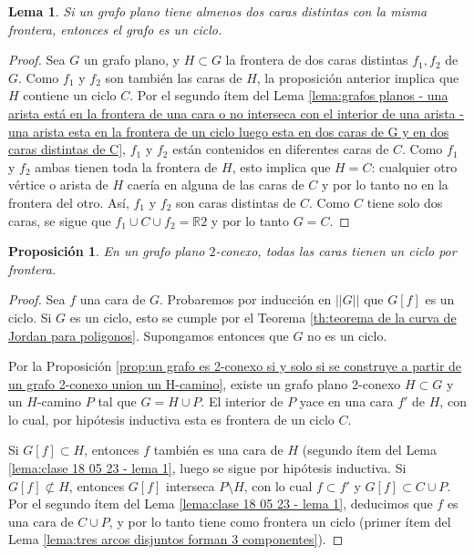 \documentclass[12pt]{report}
\theoremstyle{plain}
\newtheorem{lemma}[theorem]{Lema}
\newtheorem{proposition}[theorem]{Proposición}
\theoremstyle{definition}
\newcommand{\reals}{\mathbb{R}}
\newcommand{\Abs}[1]{\left \vert \left \vert #1 \right \vert \right \vert}
\begin{document}
\begin{lemma}\label{lema:si un grafo plano tiene almenso dos caras con la misma frontera, entonces es un ciclo}
Si un grafo plano tiene almenos dos caras distintas con la misma frontera, entonces el grafo es un ciclo.
\end{lemma}
\begin{proof}
Sea $G$ un grafo plano, y $H \subset G$ la frontera de dos caras distintas $f_1, f_2$ de $G$. Como $f_1$ y $f_2$ son también las caras de $H$, la proposición anterior implica que $H$ contiene un ciclo $C$. Por el segundo ítem del Lema \ref{lema:grafos planos - una arista está en la frontera de una cara o no interseca con el interior de una arista - una arista esta en la frontera de un ciclo luego esta en dos caras de G y en dos caras distintas de C}, $f_1$ y $f_2$ están contenidos en diferentes caras de $C$. Como $f_1$ y $f_2$ ambas tienen toda la frontera de $H$, esto implica que $H = C$: cualquier otro vértice o arista de $H$ caería en alguna de las caras de $C$ y por lo tanto no en la frontera del otro. Así, $f_1$ y $f_2$ son caras distintas de $C$. Como $C$ tiene solo dos caras, se sigue que $f_1 \cup C \cup f_2 = \reals 2$ y por lo tanto $G = C$.
\end{proof}

\begin{proposition}\label{proposicion:un grafo plano 2-conexo tiene todas sus caras con frontera un ciclo}
En un grafo plano $2$-conexo, todas las caras tienen un ciclo por frontera.
\end{proposition}
\begin{proof}
Sea $f$ una cara de $G$. Probaremos por inducción en $\Abs G$ que $G[f]$ es un ciclo. Si $G$ es un ciclo, esto se cumple por el Teorema \ref{th:teorema de la curva de Jordan para poligonos}. Supongamos entonces que $G$ no es un ciclo.

Por la Proposición \ref{prop:un grafo es 2-conexo si y solo si se construye a partir de un grafo 2-conexo union un H-camino}, existe un grafo plano $2$-conexo $H \subset G$ y un $H$-camino $P$ tal que $G = H \cup P$. El interior de $P$ yace en una cara $f'$ de $H$, con lo cual, por hipótesis inductiva esta es frontera de un ciclo $C$.

Si $G[f] \subset H$, entonces $f$ también es una cara de $H$ (segundo ítem del Lema \ref{lema:clase 18 05 23 - lema 1}, luego se sigue por hipótesis inductiva. Si $G[f] \not \subset H$, entonces $G[f]$ interseca $P \setminus H$, con lo cual $f \subset f'$ y $G[f] \subset C \cup P$. Por el segundo ítem del Lema \ref{lema:clase 18 05 23 - lema 1}, deducimos que $f$ es una cara de $C \cup P$, y por lo tanto tiene como frontera un ciclo (primer ítem del Lema \ref{lema:tres arcos disjuntos forman 3 componentes}).
\end{proof}
\end{document}
